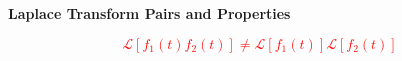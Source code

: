 \documentclass[10pt]{article}
\begin{document}
\centerline{\large {\bf Laplace Transform Pairs and Properties}}
\vspace{1ex}

\textcolor{red}{
\begin{equation}
  \mathcal{L}[ f_1(t) f_2(t) ] \neq \mathcal{L}[f_1(t)]\mathcal{L}[f_2(t)]
\end{equation}
}
\end{document}
